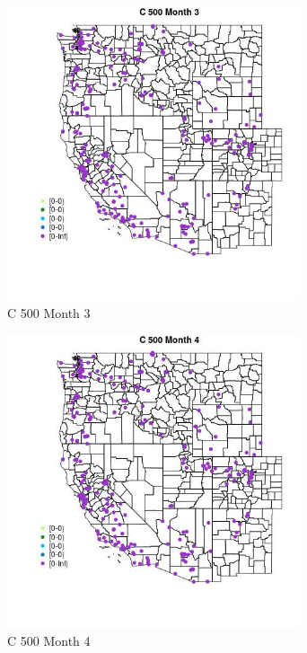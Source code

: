 \begin{figure} 
\centering  
\includegraphics[width=0.77\textwidth]{Code_Outputs/Report_ML_input_PM25_Step4_part_e_de_duplicated_aveswNAs_MapObsMo3C_500.jpg} 
\caption{\label{fig:Report_ML_input_PM25_Step4_part_e_de_duplicated_aveswNAsMapObsMo3C_500}C 500 Month 3} 
\end{figure} 
 

\clearpage 

\begin{figure} 
\centering  
\includegraphics[width=0.77\textwidth]{Code_Outputs/Report_ML_input_PM25_Step4_part_e_de_duplicated_aveswNAs_MapObsMo4C_500.jpg} 
\caption{\label{fig:Report_ML_input_PM25_Step4_part_e_de_duplicated_aveswNAsMapObsMo4C_500}C 500 Month 4} 
\end{figure} 
 

